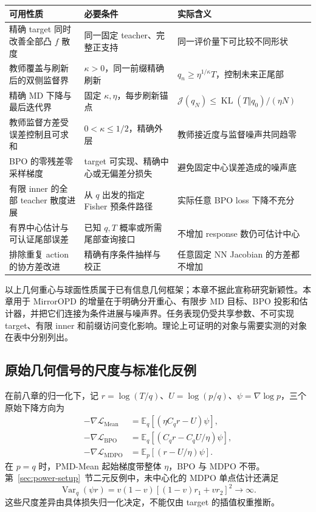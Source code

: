 \documentclass[lang=cn,scheme=chinese,openany]{../book/elegantbook}
\newcommand{\E}{\mathbb E}
\newcommand{\KL}{\operatorname{KL}}
\newcommand{\Var}{\operatorname{Var}}
\begin{document}
\begin{center}
\small
\begin{tabular}{p{46mm}p{54mm}p{45mm}}
\toprule
可用性质 & 必要条件 & 实际含义\\
\midrule
精确 target 同时改善全部凸 $f$ 散度 & 同一固定 teacher、完整正支持 & 同一评价量下可比较不同形状\\
教师覆盖与刷新后的双侧监督界 & $\kappa>0$，同一前缀精确刷新 & $q_n\ge\eta^{1/\kappa}T$，控制未来正尾部\\
精确 MD 下降与最后迭代界 & 固定 $\kappa,\eta$，每步刷新锚点 & $\mathcal J(q_N)\le\KL(T\Vert q_0)/(\eta N)$\\
教师监督方差受误差控制且可求和 & $0<\kappa\le1/2$，精确外层 & 教师接近度与监督噪声共同趋零\\
BPO 的零残差零采样梯度 & target 可实现、精确中心或无偏差分损失 & 避免固定中心误差造成的噪声底\\
有限 inner 的全部 teacher 散度进展 & 从 $q$ 出发的指定 Fisher 预条件路径 & 实际任意 BPO loss 下降不充分\\
有界中心估计与可认证尾部误差 & 已知 $q,T$ 概率或所需尾部查询接口 & 不增加 response 数仍可估计中心\\
排除重复 action 的协方差改进 & 精确有序条件抽样与校正 & 任意固定 NN Jacobian 的方差都不增加\\
\bottomrule
\end{tabular}
\end{center}

以上几何重心与球面性质属于已有信息几何框架；本章不据此宣称研究新颖性。本章用于 MirrorOPD 的增量在于明确分开重心、有限步 MD 目标、BPO 投影和估计器，并把它们连接为条件进展与噪声界。任务表现仍受共享参数、不可实现 target、有限 inner 和前缀访问变化影响。理论上可证明的对象与需要实测的对象在表中分别列出。

\subsection{原始几何信号的尺度与标准化反例}

在前八章的归一化下，记 $r=\log(T/q)$、$U=\log(p/q)$、$\psi=\nabla\log p$，三个原始下降方向为
\begin{align}
 -\nabla\mathcal L_{\mathrm{Mean}}&=\E_q[(\eta C_qr-U)\psi],\\
 -\nabla\mathcal L_{\mathrm{BPO}}&=\E_q[(C_qr-C_qU/\eta)\psi],\\
 -\nabla\mathcal L_{\mathrm{MDPO}}&=\E_p[(r-U/\eta)\psi].
\end{align}
在 $p=q$ 时，PMD-Mean 起始梯度带整体 $\eta$，BPO 与 MDPO 不带。第~\ref{sec:power-setup}~节二元反例中，未中心化的 MDPO 单点估计还满足
\begin{equation}
 \Var_q(\psi r)=v(1-v)[(1-v)r_1+vr_2]^2\longrightarrow\infty.
\end{equation}
这些尺度差异由具体损失归一化决定，不能仅由 target 的插值权重推断。
\end{document}
